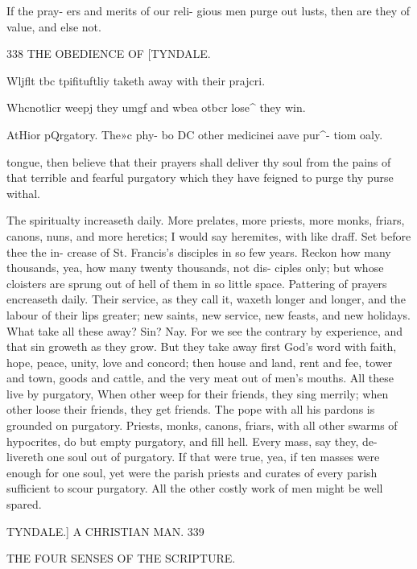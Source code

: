 \documentclass{custom}
\begin{document}
{If the pray- 
ers and 
merits of 
our reli- 
gious men 
purge out 
lusts, then 
are they of 
value, and 
else not. 


338
THE OBEDIENCE OF
[TYNDALE.

Wljflt tbc 
tpifituftliy 
taketh 
away with 
their 
prajcri. 

Whcnotlicr 
weepj they 
umgf and 
wbea otbcr 
lose^ they 
win. 

AtHior 
pQrgatory. 
The»c phy- 
bo DC other 
medicinei 
aave pur^- 
tiom oaly. 

tongue, then believe that their prayers shall deliver thy 
soul from the pains of that terrible and fearful purgatory 
which they have feigned to purge thy purse withal. 

The spiritualty increaseth daily. More prelates, more 
priests, more monks, friars, canons, nuns, and more heretics; 
I would say heremites, with like draff. Set before thee the in- 
crease of St. Francis's disciples in so few years. Reckon how 
many thousands, yea, how many twenty thousands, not dis- 
ciples only; but whose cloisters are sprung out of hell of 
them in so little space. Pattering of prayers encreaseth 
daily. Their service, as they call it, waxeth longer and 
longer, and the labour of their lips greater; new saints, 
new service, new feasts, and new holidays. What take 
all these away? Sin? Nay. For we see the contrary 
by experience, and that sin groweth as they grow. But 
they take away first God's word with faith, hope, peace, 
unity, love and concord; then house and land, rent and 
fee, tower and town, goods and cattle, and the very meat 
out of men's mouths. All these live by purgatory, When 
other weep for their friends, they sing merrily; when 
other loose their friends, they get friends. The pope with 
all his pardons is grounded on purgatory. Priests, monks, 
canons, friars, with all other swarms of hypocrites, do but 
empty purgatory, and fill hell. Every mass, say they, de- 
livereth one soul out of purgatory. If that were true, 
yea, if ten masses were enough for one soul, yet were the 
parish priests and curates of every parish sufficient to 
scour purgatory. All the other costly work of men might 
be well spared. 


TYNDALE.] A CHRISTIAN MAN. 339

THE FOUR SENSES OF THE SCRIPTURE. 

}
\end{document}
